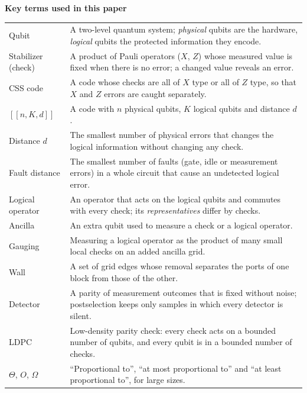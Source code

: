 \documentclass[10pt,a4paper,twocolumn]{article}
\begin{document}
\onecolumn
\setcounter{page}{2}
\tableofcontents

\vspace{1cm}
\noindent\textbf{\large Key terms used in this paper}
\medskip

\noindent
\begin{tabular}{@{}p{}p{}@{}}
\toprule
Qubit & A two-level quantum system; \emph{physical} qubits are the hardware, \emph{logical} qubits the protected information they encode.\\
Stabilizer (check) & A product of Pauli operators ($X$, $Z$) whose measured value is fixed when there is no error; a changed value reveals an error.\\
CSS code & A code whose checks are all of $X$ type or all of $Z$ type, so that $X$ and $Z$ errors are caught separately.\\
$[[n,K,d]]$ & A code with $n$ physical qubits, $K$ logical qubits and distance $d$.\\
Distance $d$ & The smallest number of physical errors that changes the logical information without changing any check.\\
Fault distance & The smallest number of faults (gate, idle or measurement errors) in a whole circuit that cause an undetected logical error.\\
Logical operator & An operator that acts on the logical qubits and commutes with every check; its \emph{representatives} differ by checks.\\
Ancilla & An extra qubit used to measure a check or a logical operator.\\
Gauging & Measuring a logical operator as the product of many small local checks on an added ancilla grid.\\
Wall & A set of grid edges whose removal separates the ports of one block from those of the other.\\
Detector & A parity of measurement outcomes that is fixed without noise; postselection keeps only samples in which every detector is silent.\\
LDPC & Low-density parity check: every check acts on a bounded number of qubits, and every qubit is in a bounded number of checks.\\
$\Theta$, $O$, $\Omega$ &``Proportional to'', ``at most proportional to'' and ``at least proportional to'', for large sizes.\\
\bottomrule
\end{tabular}
\end{document}
